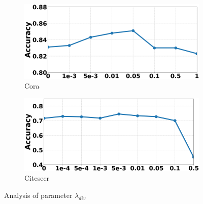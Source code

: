 \documentclass[accepted]{uai2021} %
\begin{document}
\begin{figure}[t]
    \centering
    \begin{subfigure}[b]{0.235\textwidth}
         \centering
         \includegraphics[width=1\columnwidth]{cora_divsensi_fig.png}
         \caption{\small{Cora}}
         \label{fig:divsensi_cora}
     \end{subfigure}
     \hfill
     \begin{subfigure}[b]{0.235\textwidth}
         \centering
         \includegraphics[width=1\columnwidth]{citeseer_divsensi_fig.png}
         \caption{\small{Citeseer}}
         \label{fig:divsensi_cite}
     \end{subfigure}
\caption{Analysis of parameter $\lambda_{div}$}
\label{fig:DivSensi}
\end{figure}
\end{document}
